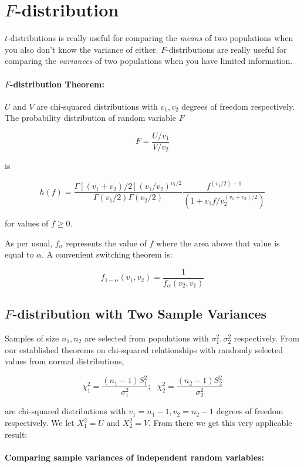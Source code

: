 \documentclass[a4paper,12pt]{report}
\begin{document}
\section{$F$-distribution}

$t$-distributions is really useful for comparing the \textit{means} of two populations when you also don't know the variance of either. $F$-distributions are really useful for comparing the \textit{variances} of two populations when you have limited information. 

\paragraph{$F$-distribution Theorem: } $U$ and $V$ are chi-squared distributions with $v_1, v_2$ degrees of freedom respectively. The probability distribution of random variable $F$

$$F = \frac{U/v_1}{V/v_2}$$

is

$$h(f) = \frac{\Gamma[(v_1+v_2)/2](v_1/v_2)^{v_1/2}}{\Gamma(v_1/2)\Gamma(v_2/2)} \frac{f^{(v_1/2)-1}}{(1+v_1f/v_2^{(v_1 + v_2)/2})}$$

for values of $f \geq 0$. 

As per usual, $f_\alpha$ represents the value of $f$ where the area above that value is equal to $\alpha$. A convenient switching theorem is: 

$$f_{1-\alpha}(v_1, v_2) = \frac{1}{f_\alpha(v_2, v_1)}$$

\subsection{$F$-distribution with Two Sample Variances}

Samples of size $n_1, n_2$ are selected from populations with $\sigma_1^2, \sigma_2^2$ respectively. From our established theorems on chi-squared relationships with randomly selected values from normal distributions, 

$$\chi_1^2 = \frac{(n_1 - 1)S_1^2}{\sigma_1^2}; \,\,\,\, \chi_2^2 = \frac{(n_2 - 1)S_2^2}{\sigma_2^2}$$

are chi-squared distributions with $v_1 = n_1 - 1, v_2 = n_2 - 1$ degrees of freedom respectively. We let $X_1^2 = U$ and $X_2^2 = V$. From there we get this very applicable result: 

\paragraph{Comparing sample variances of independent random variables: } 
\end{document}
